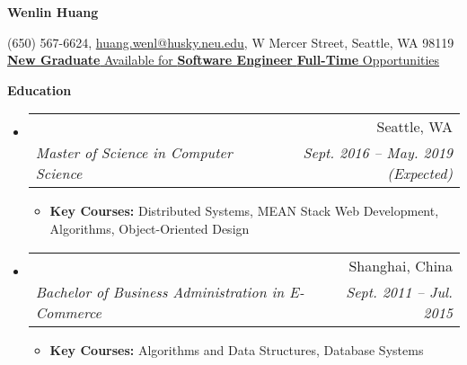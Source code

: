 \documentclass{article}
\makeatletter
\newcommand{\resitem}[1]{
    \item #1
    \vspace{-2pt}
}
\newcommand{\resheading}[1]{{\large \colorbox{mygrey}{\begin{minipage}{\textwidth}{\textbf{#1 \vphantom{p\^{E}}}}\end{minipage}}}}
\newcommand{\ressubheading}[4]{
\begin{tabular*}{6.80in}{l@{\extracolsep{\fill}}r}
    \textbf{#1} & #2 \\
    \textit{#3} & \textit{#4} \\
\end{tabular*}\vspace{-6pt}}
\makeatother
\begin{document}

    \centering\textbf{\huge Wenlin Huang}\\ \vspace{0.1in}

    (650) 567-6624,
    \href {mailto:huang.wenl@husky.neu.edu} {huang.wenl@husky.neu.edu},
    {W Mercer Street, Seattle, WA 98119} \\

    {
        \underline{
            \textbf{New Graduate}
            Available for
            \textbf{Software Engineer}
            \textbf{Full-Time}
            Opportunities
        }
    }


    \resheading{Education}
    \begin{itemize}
        \item
        \ressubheading  %
        {\href
        {http://www.northeastern.edu}
        {Northeastern University}
        }
        {Seattle, WA}
        {Master of Science in Computer Science}
        {Sept. 2016 -- May. 2019 (Expected)}
        {\footnotesize
        \begin{itemize}
            \resitem
            {
            \textbf{Key Courses:} Distributed Systems, MEAN Stack Web Development,
            Algorithms, Object-Oriented Design
            }
        \end{itemize}
        }

        \item
        \ressubheading
        {\href
        {http://www.shnu.edu.cn/}
        {Shanghai Normal University}
        }
        {Shanghai, China}
        {Bachelor of Business Administration in E-Commerce}
        {Sept. 2011 -- Jul. 2015}
        {
        \footnotesize
        \begin{itemize}
            \resitem
            {
            \textbf{Key Courses:} Algorithms and Data Structures, Database Systems
            }
        \end{itemize}
        }

    \end{itemize}
\end{document}
